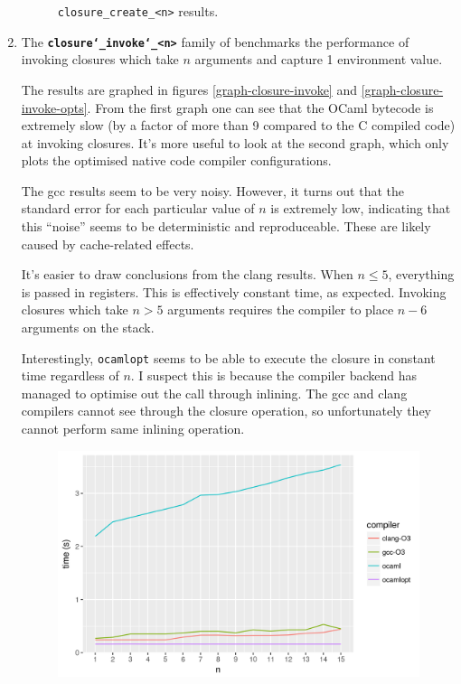 \documentclass[12pt,a4paper,twoside,openright]{report}
\begin{document}
\begin{enumerate}
\begin{figure}[h]
  \caption{\lstinline!closure_create_<n>! results.}\label{graph-closure-create}
\end{figure}


  \item
    The \textbf{\texttt{closure\char`_invoke\char`_<n>}} family of benchmarks the performance of
    invoking closures which take $n$ arguments and capture 1 environment value.

    The results are graphed in figures \ref{graph-closure-invoke} and
    \ref{graph-closure-invoke-opts}. From the first graph one can see that the
    OCaml bytecode is extremely slow (by a factor of more than 9 compared to
    the C compiled code) at invoking closures. It's more useful to look at the
    second graph, which only plots the optimised native code compiler configurations.

    The gcc results seem to be very noisy. However, it turns out that the
    standard error for each particular value of $n$ is extremely low,
    indicating that this ``noise'' seems to be deterministic and
    reproduceable. These are likely caused by cache-related effects.

    It's easier to draw conclusions from the clang results. When $n \le 5$,
    everything is passed in registers. This is effectively constant time, as expected.
    Invoking closures which take $n > 5$ arguments requires the compiler to place $n - 6$
    arguments on the stack.

    Interestingly, \lstinline!ocamlopt! seems to be able to execute the closure
    in constant time regardless of $n$. I suspect this is because the
    compiler backend has managed to optimise out the call through inlining.
    The gcc and clang compilers cannot see through the closure operation, so
    unfortunately they cannot perform same inlining operation.

    \begin{figure}[h]
\centering
  \includegraphics[width=16cm]{resultclosure_invoke_summary_all-b477d4580}


\end{figure}
\end{enumerate}
\end{document}
